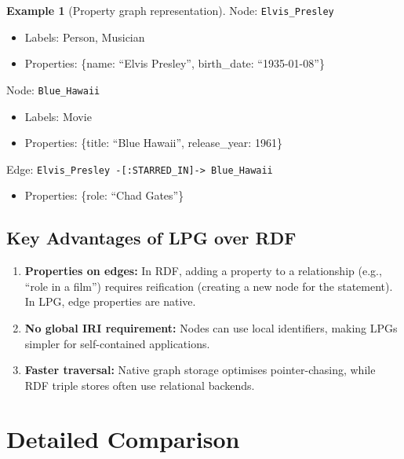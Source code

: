 \documentclass[11pt,a4paper,oneside,openany]{book}
\theoremstyle{definition}
\newtheorem{example}{Example}[chapter]
\theoremstyle{plain}
\theoremstyle{remark}
\begin{document}
\begin{example}[Property graph representation]
	\label{ex:lpg}
	Node: \texttt{Elvis\_Presley}
	\begin{itemize}
		\item Labels: {Person, Musician}
		\item Properties: \{name: ``Elvis Presley'', birth\_date: ``1935-01-08''\}
	\end{itemize}
	Node: \texttt{Blue\_Hawaii}
	\begin{itemize}
		\item Labels: {Movie}
		\item Properties: \{title: ``Blue Hawaii'', release\_year: 1961\}
	\end{itemize}
	Edge: \texttt{Elvis\_Presley -[:STARRED\_IN]-> Blue\_Hawaii}
	\begin{itemize}
		\item Properties: \{role: ``Chad Gates''\}
	\end{itemize}
\end{example}

\subsection{Key Advantages of LPG over RDF}

\begin{enumerate}
	\item \textbf{Properties on edges:} In RDF, adding a property to a relationship (e.g., ``role in a film'') requires reification (creating a new node for the statement). In LPG, edge properties are native.
	\item \textbf{No global IRI requirement:} Nodes can use local identifiers, making LPGs simpler for self-contained applications.
	\item \textbf{Faster traversal:} Native graph storage optimises pointer-chasing, while RDF triple stores often use relational backends.
\end{enumerate}

\section{Detailed Comparison}\label{sec:rdf-vs-lpg}
\end{document}
